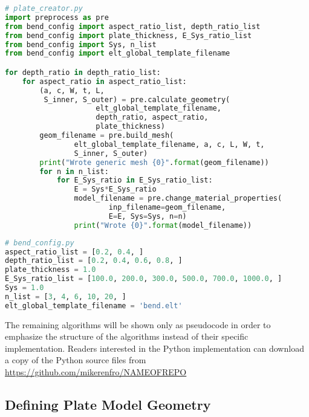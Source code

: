\begin{Spacing}{1}
\begin{lstlisting}[language=Python,caption={Python implementation of Plate Creator algorithm}, label=lst:plate-creator]
# plate_creator.py
import preprocess as pre
from bend_config import aspect_ratio_list, depth_ratio_list
from bend_config import plate_thickness, E_Sys_ratio_list
from bend_config import Sys, n_list
from bend_config import elt_global_template_filename

for depth_ratio in depth_ratio_list:
    for aspect_ratio in aspect_ratio_list:
        (a, c, W, t, L,
         S_inner, S_outer) = pre.calculate_geometry(
                     elt_global_template_filename,
                     depth_ratio, aspect_ratio,
                     plate_thickness)
        geom_filename = pre.build_mesh(
                elt_global_template_filename, a, c, L, W, t,
                S_inner, S_outer)
        print("Wrote generic mesh {0}".format(geom_filename))
        for n in n_list:
            for E_Sys_ratio in E_Sys_ratio_list:
                E = Sys*E_Sys_ratio
                model_filename = pre.change_material_properties(
                        inp_filename=geom_filename,
                        E=E, Sys=Sys, n=n)
                print("Wrote {0}".format(model_filename))
\end{lstlisting}
\end{Spacing}

\begin{Spacing}{1}
\begin{lstlisting}[language=Python,caption={Python implementation for subset of geometry and material configurations}, label=lst:bend-config]
# bend_config.py
aspect_ratio_list = [0.2, 0.4, ]
depth_ratio_list = [0.2, 0.4, 0.6, 0.8, ]
plate_thickness = 1.0
E_Sys_ratio_list = [100.0, 200.0, 300.0, 500.0, 700.0, 1000.0, ]
Sys = 1.0
n_list = [3, 4, 6, 10, 20, ]
elt_global_template_filename = 'bend.elt'
\end{lstlisting}
\end{Spacing}

The remaining algorithms will be shown only as pseudocode in order to emphasize the structure of the algorithms instead of their specific implementation.
Readers interested in the Python implementation can download a copy of the Python source files from \url{https://github.com/mikerenfro/NAMEOFREPO}

\subsection{Defining Plate Model Geometry}


